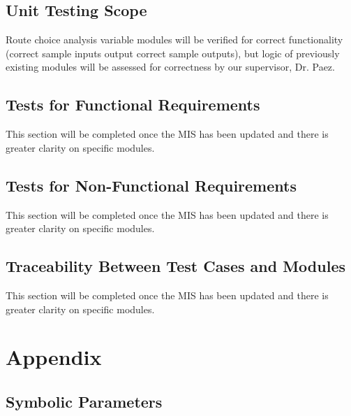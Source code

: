\documentclass[12pt, titlepage]{article}
\begin{document}
\subsection{Unit Testing Scope}

Route choice analysis variable modules will be verified for correct functionality (correct sample inputs output correct sample outputs), but logic of previously existing modules will be assessed for correctness by our supervisor, Dr. Paez.

\subsection{Tests for Functional Requirements}

This section will be completed once the MIS has been updated and there is greater clarity on specific modules. 

\subsection{Tests for Non-Functional Requirements}

This section will be completed once the MIS has been updated and there is greater clarity on specific modules. 

\subsection{Traceability Between Test Cases and Modules}
This section will be completed once the MIS has been updated and there is greater clarity on specific modules. 
				




\newpage

\section{Appendix}

\subsection{Symbolic Parameters}
\end{document}
